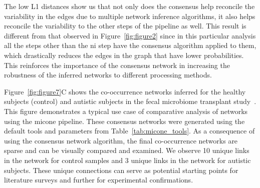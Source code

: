   The low L1 distances show us that not only does the consensus help reconcile the variability in the edges due to multiple network inference algorithms, it also helps reconcile the variability to the other steps of the pipeline as well.
  This result is different from that observed in Figure~\ref{fig:figure2} since in this particular analysis all the steps other than the \ac{ni} step have the consensus algorithm applied to them, which drastically reduces the edges in the graph that have lower probabilities.
  This reinforces the importance of the consensus network in increasing the robustness of the inferred networks to different processing methods.

  Figure~\ref{fig:figure7}C shows the co-occurrence networks inferred for the healthy subjects (control) and autistic subjects in the fecal microbiome transplant study~\cite{Kang2017}.
  This figure demonstrates a typical use case of comparative analysis of networks using the \ac{micone} pipeline.
  These consensus networks were generated using the default tools and parameters from Table~\ref{tab:micone_tools}.
  As a consequence of using the consensus network algorithm, the final co-occurrence networks are sparse and can be visually compared and examined.
  We observe 10 unique links in the network for control samples and 3 unique links in the network for autistic subjects.
  These unique connections can serve as potential starting points for literature surveys and further for experimental confirmations.

